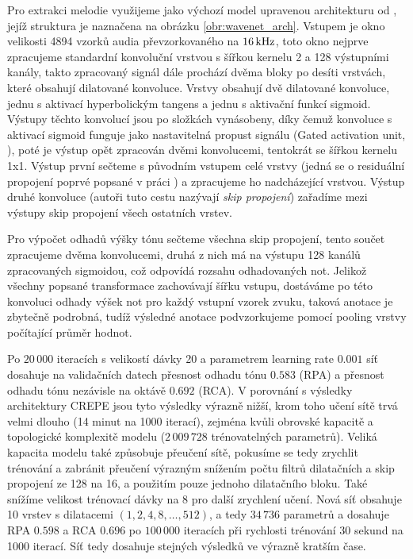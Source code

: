 Pro extrakci melodie využijeme jako výchozí model upravenou architekturu od \cite{Martak2018}, jejíž struktura je naznačena na obrázku \ref{obr:wavenet_arch}. Vstupem je okno velikosti 4894 vzorků audia převzorkovaného na $16\,\rm kHz$, toto okno nejprve zpracujeme standardní konvoluční vrstvou s šířkou kernelu 2 a 128 výstupními kanály, takto zpracovaný signál dále prochází dvěma bloky po desíti vrstvách, které obsahují dilatované konvoluce. Vrstvy obsahují dvě dilatované konvoluce, jednu s aktivací hyperbolickým tangens a jednu s aktivační funkcí sigmoid. Výstupy těchto konvolucí jsou po složkách vynásobeny, díky čemuž konvoluce s aktivací sigmoid funguje jako nastavitelná propust signálu (Gated activation unit, \cite{Oord2016a}), poté je výstup opět zpracován dvěmi konvolucemi, tentokrát se šířkou kernelu 1x1. Výstup první sečteme s původním vstupem celé vrstvy (jedná se o residuální propojení poprvé popsané v práci \cite{He2015}) a zpracujeme ho nadcházející vrstvou. Výstup druhé konvoluce (autoři tuto cestu nazývají \emph{skip propojení}) zařadíme mezi výstupy skip propojení všech ostatních vrstev.

Pro výpočet odhadů výšky tónu sečteme všechna skip propojení, tento součet zpracujeme dvěma konvolucemi, druhá z nich má na výstupu 128 kanálů zpracovaných sigmoidou, což odpovídá rozsahu odhadovaných not. Jelikož všechny popsané transformace zachovávají šířku vstupu, dostáváme po této konvoluci odhady výšek not pro každý vstupní vzorek zvuku, taková anotace je zbytečně podrobná, tudíž výsledné anotace podvzorkujeme pomocí pooling vrstvy počítající průměr hodnot.


Po $20\,000$ iteracích s velikostí dávky 20 a parametrem learning rate $0.001$ síť dosahuje na validačních datech přesnost odhadu tónu $0.583$ (RPA) a přesnost odhadu tónu nezávisle na oktávě $0.692$ (RCA). V porovnání s výsledky architektury CREPE jsou tyto výsledky výrazně nižší, krom toho učení sítě trvá velmi dlouho (14 minut na 1000 iterací), zejména kvůli obrovské kapacitě a topologické komplexitě modelu ($2\,009\,728$ trénovatelných parametrů). Veliká kapacita modelu také způsobuje přeučení sítě, pokusíme se tedy zrychlit trénování a zabránit přeučení výrazným snížením počtu filtrů dilatačních a skip propojení ze 128 na 16, a použitím pouze jednoho dilatačního bloku. Také snížíme velikost trénovací dávky na 8 pro další zrychlení učení. Nová síť obsahuje 10 vrstev s dilatacemi $(1, 2, 4, 8, \dots, 512)$, a tedy $34\,736$ parametrů a dosahuje RPA $0.598$ a RCA $0.696$ po $100\,000$ iteracích při rychlosti trénování 30 sekund na 1000 iterací. Síť tedy dosahuje stejných výsledků ve výrazně kratším čase.

